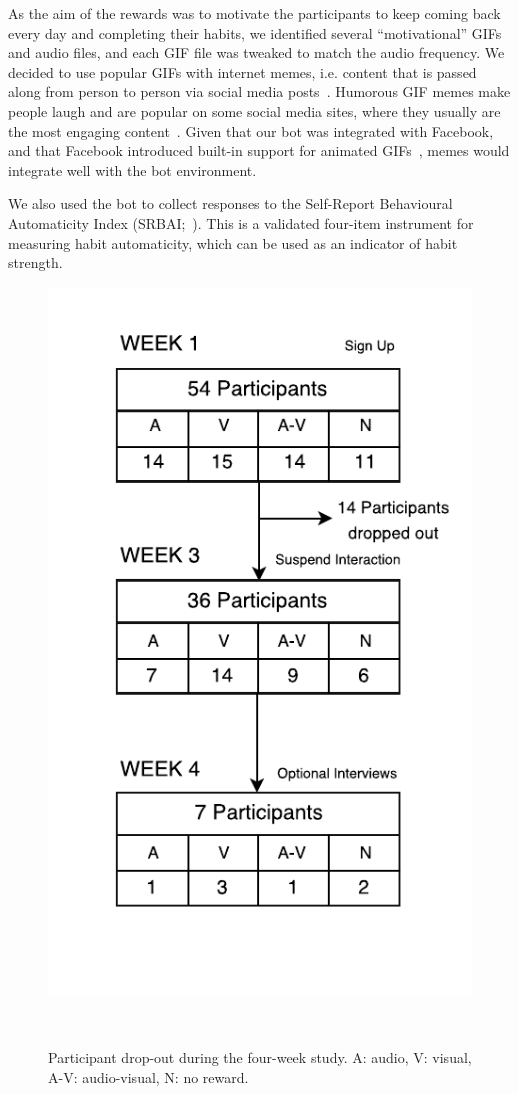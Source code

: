 \documentclass{scaffold/sigchi}
\begin{document}
As the aim of the rewards was to motivate the participants to keep coming back every day and completing their habits, we identified several ``motivational'' GIFs and audio files, and each GIF file was tweaked to match the audio frequency. We decided to use popular GIFs with internet memes, i.e. content that is passed along from person to person via social media posts~\cite{meme_definition}. Humorous GIF memes make people laugh and are popular on some social media sites, where they usually are the most engaging content~\cite{meme_gifs_are_good}. Given that our bot was integrated with Facebook, and that Facebook introduced built-in support for animated GIFs~\cite{fb_gif_rollout}, memes would integrate well with the bot environment. 

We also used the bot to collect responses to the Self-Report Behavioural Automaticity Index (SRBAI;~\cite{article_4q_SRBAI}). This is a validated four-item instrument for measuring habit automaticity, which can be used as an indicator of habit strength. %

\begin{figure}
  \centering
  \includegraphics[width=0.7\columnwidth]{figures/study-flow.pdf}
  \caption{Participant drop-out during the four-week study. A: audio, V: visual, A-V: audio-visual, N: no reward.}~\label{fig:study_dropout}
\end{figure}
\end{document}
